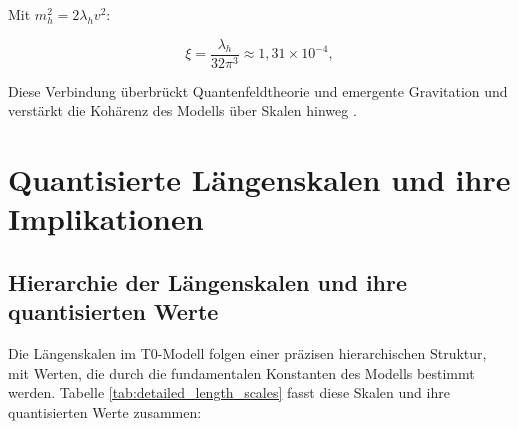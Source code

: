 \documentclass[twocolumn,aps,prl]{revtex4-2}
\begin{document}
{{{{{{{{{										Mit \(m_h^2 = 2 \lambda_h v^2\):
										
										\begin{equation}
											\xi = \frac{\lambda_h}{32 \pi^3} \approx 1{,}31 \times 10^{-4}, \label{eq:xi_higgs}
										\end{equation}
										
										Diese Verbindung überbrückt Quantenfeldtheorie und emergente Gravitation und verstärkt die Kohärenz des Modells über Skalen hinweg \cite{pascher_higgs_2025}.
										
										\section{Quantisierte Längenskalen und ihre Implikationen}
										\label{sec:length_scales}
										
										\subsection{Hierarchie der Längenskalen und ihre quantisierten Werte}
										\label{subsec:detailed_length_scales}
										
										Die Längenskalen im T0-Modell folgen einer präzisen hierarchischen Struktur, mit Werten, die durch die fundamentalen Konstanten des Modells bestimmt werden. Tabelle \ref{tab:detailed_length_scales} fasst diese Skalen und ihre quantisierten Werte zusammen:
										
}}}}}}}}}
\end{document}
